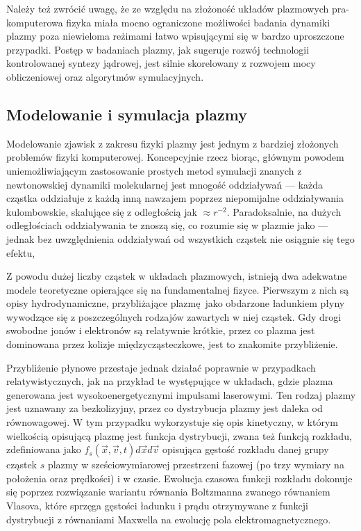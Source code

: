     Należy też zwrócić uwagę, że ze względu na złożoność układów plazmowych
    pra-komputerowa fizyka miała mocno ograniczone możliwości badania
    dynamiki plazmy poza niewieloma reżimami łatwo wpisującymi się
    w bardzo uproszczone przypadki.  
    Postęp w badaniach plazmy, jak sugeruje rozwój technologii kontrolowanej syntezy
    jądrowej, jest silnie skorelowany z
    rozwojem mocy obliczeniowej oraz algorytmów symulacyjnych.%

    \subsection{Modelowanie i symulacja plazmy}

    Modelowanie zjawisk z zakresu fizyki plazmy jest jednym z bardziej
    złożonych problemów fizyki komputerowej. Koncepcyjnie rzecz biorąc, głównym
    powodem uniemożliwiającym zastosowanie prostych metod symulacji znanych z
    newtonowskiej dynamiki molekularnej jest mnogość oddziaływań --- każda cząstka
    oddziałuje z każdą inną nawzajem poprzez niepomijalne oddziaływania
    kulombowskie, skalujące się z odległością jak $\approx r^{-2}$. Paradoksalnie,
    na dużych odległościach oddziaływania te znoszą się, co rozumie się w plazmie
    jako  --- jednak bez uwzględnienia oddziaływań od
    wszystkich cząstek nie osiągnie się tego efektu,

    Z powodu dużej liczby cząstek w układach plazmowych, istnieją dwa adekwatne modele teoretyczne
    opierające się na fundamentalnej fizyce. Pierwszym z nich są opisy hydrodynamiczne,
    przybliżające plazmę jako obdarzone ładunkiem płyny wywodzące się z
    poszczególnych rodzajów zawartych w niej cząstek.
    Gdy drogi swobodne jonów i elektronów są relatywnie krótkie,
    przez co plazma jest dominowana przez kolizje międzycząsteczkowe,
    jest to znakomite przybliżenie.

    Przybliżenie płynowe przestaje jednak działać poprawnie w przypadkach
    relatywistycznych, jak na przykład te występujące w układach, gdzie plazma
    generowana jest wysokoenergetycznymi impulsami laserowymi. Ten rodzaj
    plazmy jest uznawany za bezkolizyjny, przez co dystrybucja plazmy jest
    daleka od równowagowej. W tym przypadku wykorzystuje się opis kinetyczny, w
    którym wielkością opisującą plazmę jest funkcja dystrybucji, zwana też
    funkcją rozkładu, zdefiniowana jako
    $f_s ( \vec{x}, \vec{v}, t ) d\vec{x} d\vec{v}$ 
    opisująca gęstość rozkładu danej grupy cząstek $s$ plazmy w
    sześciowymiarowej przestrzeni fazowej (po trzy wymiary na położenia oraz
    prędkości) i w czasie. Ewolucja czasowa funkcji rozkładu dokonuje się poprzez
    rozwiązanie wariantu równania Boltzmanna zwanego równaniem Vlasova, które
    sprzęga gęstości ładunku i prądu otrzymywane z funkcji dystrybucji z
    równaniami Maxwella na ewolucję pola elektromagnetycznego.

